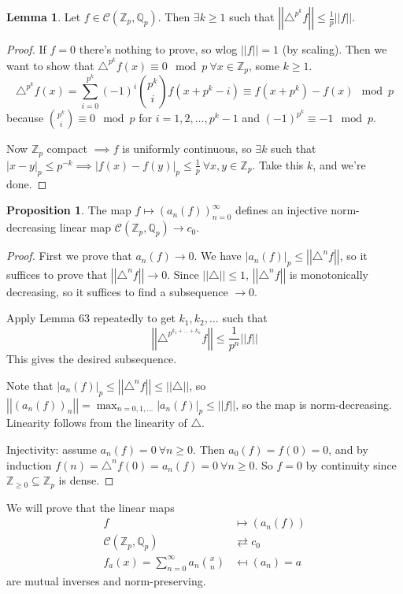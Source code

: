 \documentclass[a4paper]{article}
\theoremstyle{definition}
\theoremstyle{default}
\newtheorem{lemma}[definition]{Lemma}
\newtheorem{prop}[definition]{Proposition}
\theoremstyle{remark}
\newcommand*\abs[1]{\left|#1\right|}
\newcommand*\norm[1]{\abs{\abs{#1}}}
\begin{document}
\begin{lemma}
	Let $f \in \mathcal{C}(\mathbb{Z}_p, \mathbb{Q}_p)$.
	Then $\exists k \geq 1$ such that $\norm{\triangle^{p^k}f} \leq \frac{1}{p}\norm{f}$.
\end{lemma}
\begin{proof}
	If $f=0$ there's nothing to prove,
	so wlog $\norm{f} = 1$ (by scaling).
	Then we want to show that $\triangle^{p^k} f(x) \equiv 0 \mod p\ \forall x \in \mathbb{Z}_p$,
	some $k \geq 1$.
	$$\triangle^{p^k} f(x) = \sum_{i=0}^{p^k}(-1)^i {p^k \choose i}f(x+p^k-i) \equiv f(x+p^k) - f(x) \mod p$$
	because ${p^k \choose i} \equiv 0 \mod p$ for $i=1,2,\dots,p^k-1$ and $(-1)^{p^k} \equiv -1 \mod p$.

	Now $\mathbb{Z}_p$ compact $\implies f$ is uniformly continuous,
	so $\exists k$ such that $\abs{x-y}_p \leq p^{-k} \implies \abs{f(x)-f(y)}_p \leq \frac{1}{p}\ \forall x,y \in \mathbb{Z}_p$.
	Take this $k$, and we're done.
\end{proof}

\begin{prop}
	The map $f \mapsto (a_n(f))_{n=0}^\infty$ defines an injective norm-decreasing linear map $\mathcal{C}(\mathbb{Z}_p,\mathbb{Q}_p) \to c_0$.
\end{prop}
\begin{proof}
	First we prove that $a_n(f) \to 0$.
	We have $\abs{a_n(f)}_p \leq \norm{\triangle^n f}$,
	so it suffices to prove that $\norm{\triangle^n f} \to 0$.
	Since $\norm{\triangle} \leq 1$,
	$\norm{\triangle^n f}$ is monotonically decreasing,
	so it suffices to find a subsequence $\to 0$.
	
	Apply Lemma 63 repeatedly to get $k_1, k_2, \dots$ such that
	$$\norm{\triangle^{p^{k_1 + \dots + k_n}}f} \leq \frac{1}{p^n}\norm{f}$$
	This gives the desired subsequence.
	
	Note that $\abs{a_n(f)}_p \leq \norm{\triangle^n f} \leq \norm{\triangle}$,
	so $\norm{(a_n(f))_n} = \max_{n=0,1,\dots}\abs{a_n(f)}_p \leq \norm{f}$,
	so the map is norm-decreasing. 
	Linearity follows from the linearity of $\triangle$.
	
	Injectivity: assume $a_n(f)=0\ \forall n \geq 0$.
	Then $a_0(f) = f(0) = 0$,
	and by induction $f(n) = \triangle^n f(0) = a_n(f) = 0\ \forall n\geq 0$.
	So $f=0$ by continuity since $\mathbb{Z}_{\geq 0} \subseteq \mathbb{Z}_p$ is dense.
\end{proof}

We will prove that the linear maps
\begin{align*}
f &\mapsto (a_n(f)) \\
\mathcal{C}(\mathbb{Z}_p, \mathbb{Q}_p) &\rightleftarrows c_0 \\
f_a(x)=\sum_{n=0}^\infty a_n {x \choose n} &\mapsfrom (a_n) = a
\end{align*}
are mutual inverses and norm-preserving.
\end{document}
